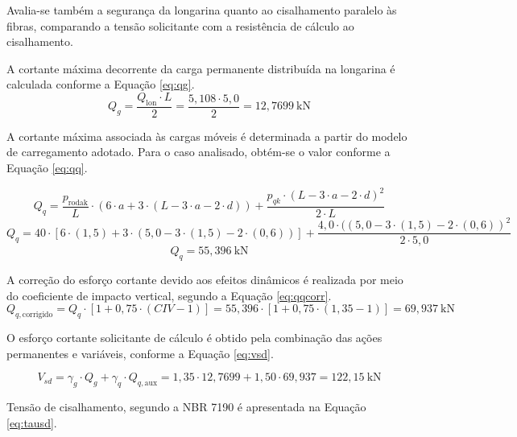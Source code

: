 Avalia-se também a segurança da longarina quanto ao cisalhamento paralelo às fibras, comparando a tensão solicitante com a resistência de cálculo ao cisalhamento.

A cortante máxima decorrente da carga permanente distribuída na longarina é calculada conforme a Equação \eqref{eq:qg}.
\begin{equation}
Q_g = \frac{Q_{\text{lon}} \cdot L}{2}
    = \frac{5{,}108 \cdot 5{,}0}{2}
    = 12{,}7699\ \text{kN}
\label{eq:qg}
\end{equation}

A cortante máxima associada às cargas móveis é determinada a partir do modelo de carregamento adotado. Para o caso analisado, obtém-se o valor conforme a Equação \eqref{eq:qq}.

\begin{equation}
Q_q = \frac{p_{\text{rodak}}}{L} \cdot \left(6 \cdot a + 3 \cdot (L - 3 \cdot a - 2 \cdot d)\right)
    + \frac{p_{qk} \cdot (L - 3 \cdot a - 2 \cdot d)^2}{2 \cdot L}
\end{equation}
\begin{equation}
Q_q = 40 \cdot \left[6 \cdot(1{,}5) + 3 \cdot (5{,}0 - 3 \cdot (1{,}5) - 2 \cdot(0{,}6))\right]
    + \frac{4{,}0 \cdot ((5{,}0 - 3 \cdot (1{,}5) - 2 \cdot (0{,}6))^2}{2 \cdot 5{,}0}
\end{equation}
\begin{equation}
Q_q = 55{,}396\ \text{kN}
\label{eq:qq}
\end{equation}

A correção do esforço cortante devido aos efeitos dinâmicos é realizada por meio do coeficiente de impacto vertical, segundo a Equação \eqref{eq:qqcorr}.
\begin{equation}
Q_{q,\text{corrigido}} = Q_q \cdot \left[1 + 0{,}75 \cdot (CIV - 1)\right]
                 = 55{,}396 \cdot \left[1 + 0{,}75 \cdot (1{,}35 - 1)\right]
                 = 69{,}937\ \text{kN}
\label{eq:qqcorr}
\end{equation}

O esforço cortante solicitante de cálculo é obtido pela combinação das ações permanentes e variáveis, conforme a Equação \eqref{eq:vsd}.

\begin{equation}
V_{sd} = \gamma_g \cdot Q_g + \gamma_q \cdot Q_{q,\text{aux}}
       = 1{,}35 \cdot 12{,}7699 + 1{,}50 \cdot 69{,}937
       = 122{,}15\ \text{kN}
\label{eq:vsd}
\end{equation}

Tensão de cisalhamento, segundo a NBR 7190 \parencite{NBR7190-1:2022} é apresentada na Equação \eqref{eq:tausd}.

